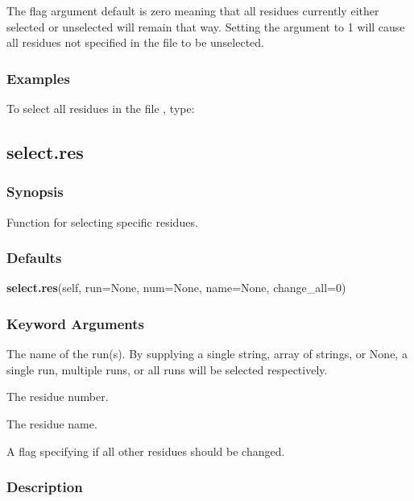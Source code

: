 The 
 flag argument default is zero meaning that all residues currently either
selected or unselected will remain that way.  Setting the argument to 1 will cause all
residues not specified in the file to be unselected.


\subsubsection{Examples}

To select all residues in the file 
, type:





\newpage

\subsection{select.res}


\subsubsection{Synopsis}

Function for selecting specific residues.

\subsubsection{Defaults}

\textsf{\textbf{select.res}(self, run=None, num=None, name=None, change\_all=0)}


\subsubsection{Keyword Arguments}


  The name of the run(s).  By supplying a single string, array of strings, or None, a single run, multiple runs, or all runs will be selected respectively.

  The residue number.

  The residue name.

  A flag specifying if all other residues should be changed.

\subsubsection{Description}

